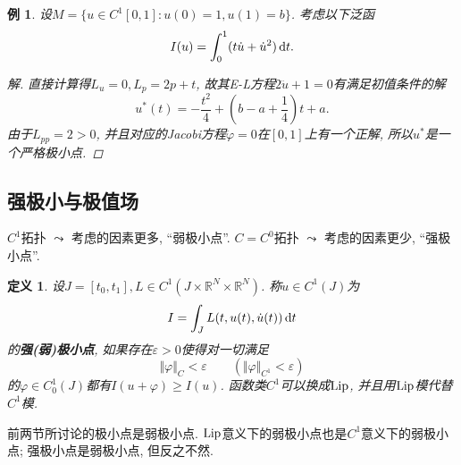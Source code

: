 \documentclass[12pt,a4paper]{article}
\newtheorem{definition}[theorem]{定义}
\newtheorem{example}[theorem]{例}
\begin{document}
\begin{example}
    设$M = \{u \in C^1[0, 1]\colon u(0) = 1, u(1) = b\}$. 考虑以下泛函 
    \begin{equation*}
        I(u) = \int_0^1(t\dot u + \dot u^2) \,{\rm d}t.
    \end{equation*}
    \begin{proof}[解]\let\qed\relax
        直接计算得$L_u = 0, L_p = 2p + t$, 故其E-L方程$2\ddot u + 1 = 0$有满足初值条件的解
        \begin{equation*}
            u^*(t) = -\frac{t^2}{4} + \left(b - a + \frac{1}{4}\right)t + a.
        \end{equation*}
        由于$L_{pp} = 2 > 0$, 并且对应的Jacobi方程$\ddot\varphi = 0$在$[0, 1]$上有一个正解, 所以$u^*$是一个严格极小点.
    \end{proof}
\end{example}

\subsection{强极小与极值场}

$C^1$拓扑 $\leadsto$ 考虑的因素更多, ``弱极小点''. $C = C^0$拓扑 $\leadsto$ 考虑的因素更少, ``强极小点''.

\begin{definition}
    设$J = [t_0, t_1], L \in C^1(J \times \mathbb{R}^N \times \mathbb{R}^N)$. 称$u \in C^1(J)$为 
    \begin{equation*}
        I = \int_JL(t, u(t), \dot u(t)) \,{\rm d}t
    \end{equation*}
    的\textbf{强(弱)极小点}, 如果存在$\varepsilon > 0$使得对一切满足
    \begin{equation*}
        \Vert \varphi \Vert_C < \varepsilon \qquad (\Vert \varphi \Vert_{C^1} < \varepsilon) 
    \end{equation*}
    的$\varphi \in C_0^1(J)$都有$I(u + \varphi) \geq I(u)$. 函数类$C^1$可以换成${\rm Lip}$, 并且用${\rm Lip}$模代替$C^1$模.
\end{definition}

前两节所讨论的极小点是弱极小点. ${\rm Lip}$意义下的弱极小点也是$C^1$意义下的弱极小点; 强极小点是弱极小点, 但反之不然.
\end{document}
